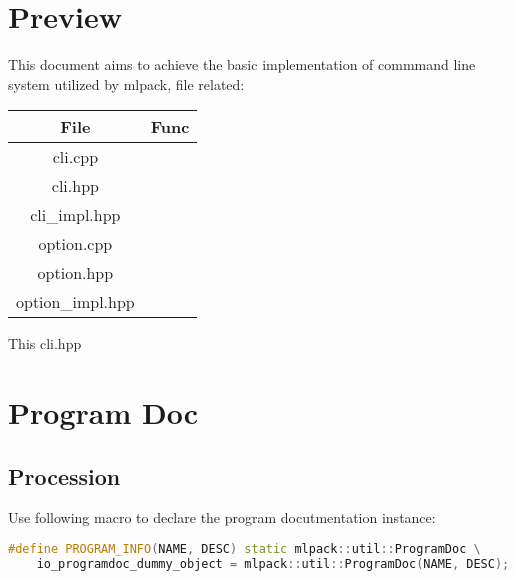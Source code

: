 \documentclass[11pt]{article}
\begin{document}
\maketitle

\Large

\clearpage
\section{Preview}%
\label{sec:preview}

This document aims to achieve the basic implementation of commmand line system utilized by mlpack, file related:

\begin{center}
  \begin{tabular}{|c|c|}
   \hline
    \textbf{File}& \textbf{Func}  \\
   \hline
    cli.cpp &  \\
   \hline
    cli.hpp &  \\
   \hline
    cli\_impl.hpp & \\
   \hline
    option.cpp &  \\
   \hline
    option.hpp &  \\
   \hline
    option\_impl.hpp & \\
   \hline
  \end{tabular}
\end{center}

This cli.hpp 


\clearpage
\section{Program Doc}%
\label{sec:program_doc}

\subsection{Procession}%
\label{sub:procession}

Use following macro  to declare the program docutmentation instance:
\begin{lstlisting}[language=c++,label=lst:0lst,caption=Data Structure(\textbf{cli.hpp})]
#define PROGRAM_INFO(NAME, DESC) static mlpack::util::ProgramDoc \
    io_programdoc_dummy_object = mlpack::util::ProgramDoc(NAME, DESC);
\end{lstlisting}
\end{document}
